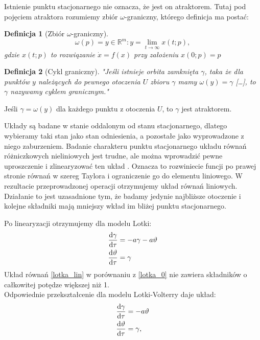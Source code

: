 \documentclass[10pt, a4paper, twoside, onecolumn]{article}
\numberwithin{equation}{section}
\newtheorem*{definition}{Definicja}
\begin{document}
	Istnienie punktu stacjonarnego nie oznacza, że jest on atraktorem. Tutaj pod pojęciem atraktora rozumiemy zbiór \(\omega\)-graniczny, którego definicja ma postać:
	\begin{definition}[Zbiór $\omega$-graniczny]
	\begin{equation*}
		\omega(p) = {y\in\mathbb{R}^{m}: y = \lim_{t\to\infty}}x(t; p),
	\end{equation*}
	gdzie \(x(t; p)\) to rozwiązanie \(\dot{x}=f(x)\) przy założeniu \(x(0; p) = p\)
	\end{definition}
	\begin{definition}[Cykl graniczny]
		"Jeśli istnieje orbita zamknięta $\gamma$, taka że dla punktów $y$ należących do pewnego otoczenia $U$ zbioru $\gamma$ mamy \(\omega(y)=\gamma\) [\ldots], to $\gamma$ nazywamy \emph{cyklem granicznym}."
	\end{definition}\noindent
	Jeśli \(\gamma=\omega(y)\) dla każdego punktu z otoczenia $U$, to $\gamma$ jest atraktorem. \cite{palczewski} \par
	Układy są badane w stanie oddalonym od stanu stacjonarnego, dlatego wybieramy taki stan jako stan odniesienia, a pozostałe jako wyprowadzone z niego zaburzeniem.
	Badanie charakteru punktu stacjonarnego układu równań różniczkowych nieliniowych jest trudne, ale można wprowadzić pewne uproszczenie i zlinearyzować ten układ \cite{kawczynski, palczewski}. Oznacza to rozwiniecie funcji po prawej stronie równań w szereg Taylora i ograniczenie go do elementu liniowego. W rezultacie przeprowadzonej operacji otrzymujemy układ równań liniowych. Działanie to jest uzasadnione tym, że badamy jedynie najbliższe otoczenie i kolejne składniki mają mniejszy wkład im bliżej punktu stacjonarnego. \par
	Po linearyzacji otrzymujemy dla modelu Lotki:
	\begin{equation}\label{lotka_lin}
	\begin{split}
		\dv{\gamma}{\tau} &= -a\gamma-a\vartheta \\
		\dv{\vartheta}{\tau} &= \gamma
	\end{split}
	\end{equation}
	Układ równań \eqref{lotka_lin} w porównaniu z \eqref{lotka_0} nie zawiera składników o całkowitej potędze większej niż 1. \\
	Odpowiednie przekształcenie dla modelu Lotki-Volterry daje układ:
	\begin{equation}\label{lotka_volterra_lin}
	\begin{split}
		\dv{\gamma}{\tau} &= -a\vartheta \\
		\dv{\vartheta}{\tau} &= \gamma,
	\end{split}
	\end{equation}
\end{document}
